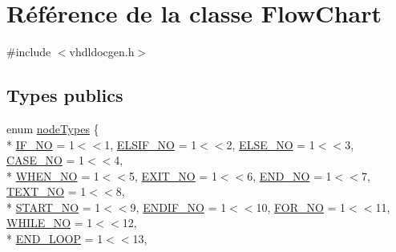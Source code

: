 \hypertarget{class_flow_chart}{}\section{Référence de la classe Flow\+Chart}
\label{class_flow_chart}


{\ttfamily \#include $<$vhdldocgen.\+h$>$}

\subsection*{Types publics}
\begin{DoxyCompactItemize}
\item 
enum \hyperlink{class_flow_chart_acd787d5c3faa541b938e0d58c800572c}{node\+Types} \{ \\*
\hyperlink{class_flow_chart_acd787d5c3faa541b938e0d58c800572ca016ebee2535fd749ec83e830c93dae86}{I\+F\+\_\+\+N\+O} = 1$<$$<$1, 
\hyperlink{class_flow_chart_acd787d5c3faa541b938e0d58c800572caf7a5717aa5bac2f250ab4e68a487912b}{E\+L\+S\+I\+F\+\_\+\+N\+O} = 1$<$$<$2, 
\hyperlink{class_flow_chart_acd787d5c3faa541b938e0d58c800572ca23ef4fff80ce6ee01198e2eed1d74ec2}{E\+L\+S\+E\+\_\+\+N\+O} = 1$<$$<$3, 
\hyperlink{class_flow_chart_acd787d5c3faa541b938e0d58c800572caddeba7e93199e159a70560537023be3d}{C\+A\+S\+E\+\_\+\+N\+O} = 1$<$$<$4, 
\\*
\hyperlink{class_flow_chart_acd787d5c3faa541b938e0d58c800572cadb18b146f68f17a2005af45fd53a41d3}{W\+H\+E\+N\+\_\+\+N\+O} = 1$<$$<$5, 
\hyperlink{class_flow_chart_acd787d5c3faa541b938e0d58c800572ca816c3e602bf735d34804cdbd1f32adf0}{E\+X\+I\+T\+\_\+\+N\+O} = 1$<$$<$6, 
\hyperlink{class_flow_chart_acd787d5c3faa541b938e0d58c800572cacd28dbdea10a3dc04788bb5b7f93237a}{E\+N\+D\+\_\+\+N\+O} = 1$<$$<$7, 
\hyperlink{class_flow_chart_acd787d5c3faa541b938e0d58c800572ca568c64d6bc279ed6097e26de53523adc}{T\+E\+X\+T\+\_\+\+N\+O} = 1$<$$<$8, 
\\*
\hyperlink{class_flow_chart_acd787d5c3faa541b938e0d58c800572ca1d1feec1c0b7fc94f2de8265155467ec}{S\+T\+A\+R\+T\+\_\+\+N\+O} = 1$<$$<$9, 
\hyperlink{class_flow_chart_acd787d5c3faa541b938e0d58c800572ca179994ac1a96f9177e2bb34d949c16a4}{E\+N\+D\+I\+F\+\_\+\+N\+O} = 1$<$$<$10, 
\hyperlink{class_flow_chart_acd787d5c3faa541b938e0d58c800572ca20ebc89c9bca7b02af08669632b9a658}{F\+O\+R\+\_\+\+N\+O} = 1$<$$<$11, 
\hyperlink{class_flow_chart_acd787d5c3faa541b938e0d58c800572ca83a7f901b277a6663270779a1b4619ed}{W\+H\+I\+L\+E\+\_\+\+N\+O} = 1$<$$<$12, 
\\*
\hyperlink{class_flow_chart_acd787d5c3faa541b938e0d58c800572ca7596c90f02f7c88a6322c09b60ee76a1}{E\+N\+D\+\_\+\+L\+O\+O\+P} = 1$<$$<$13, 
$$
\end{DoxyCompactItemize}
